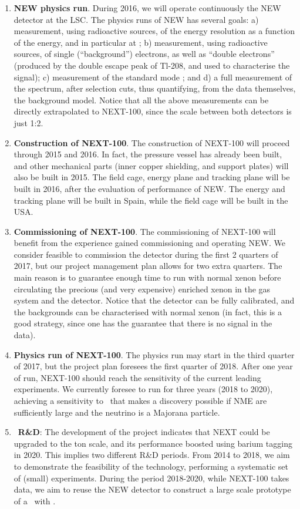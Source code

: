 \begin{enumerate}
\item {\bf NEW physics run}. During 2016, we will operate continuously the NEW detector at the LSC. The physics runs of NEW has several goals: a) measurement, using radioactive sources, of the energy resolution as a function of the energy, and in particular at \Qbb; b) measurement, using radioactive sources, of single (``background'') electrons, as well as ``double electrons'' (produced by the double escape peak of Tl-208, and used to characterise the signal); c) measurement of the standard mode \bbtnu; and d) a full measurement of the spectrum, after selection cuts, thus quantifying, from the data themselves, the background model. Notice that all the above measurements can be directly extrapolated to NEXT-100, since the scale between both detectors is just 1:2. 
%

\item {\bf Construction of NEXT-100}. The construction of NEXT-100 will proceed through 2015 and 2016. In fact, the pressure vessel has already been built, and other mechanical parts (inner copper shielding, and support plates) will also be built in 2015. The field cage, energy plane and tracking plane will be built in 2016, after the evaluation of performance of NEW. The energy and tracking plane will be built in Spain, while the field cage will be built in the USA.

\item {\bf Commissioning of NEXT-100}. The commissioning of NEXT-100 will benefit from the experience gained commissioning and operating NEW. We consider feasible to commission the detector during the first 2 quarters of 2017, but our project management plan allows for two extra quarters. The main reason is to guarantee enough time to run with normal xenon before circulating the precious (and very expensive) enriched xenon in the gas system and the detector. Notice that the detector can be fully calibrated, and the backgrounds can be characterised with normal xenon (in fact, this is a good strategy, since one has the guarantee that there is no signal in the data).  

\item {\bf Physics run of NEXT-100}. The physics run may start in the third quarter of 2017, but the project plan foresees the first quarter of 2018. After one year of run, NEXT-100 should reach the sensitivity of the current leading experiments. We currently foresee to run for three years (2018 to 2020), achieving a sensitivity to \mbb\ that makes a discovery possible if NME are sufficiently large and the neutrino is a Majorana particle. 

\item { \BATA\ \bf R\&D}: The development of the project indicates that NEXT could be upgraded to the ton scale, and its performance boosted using barium tagging in 2020. This implies two different R\&D periods. From 2014 to 2018, we aim to demonstrate the feasibility of the technology, performing a systematic set of (small) experiments. During the period 2018-2020, while NEXT-100 takes data, we aim to reuse the NEW detector to construct a large scale prototype of a \HPXE\ with \BATA. 

\end{enumerate}

